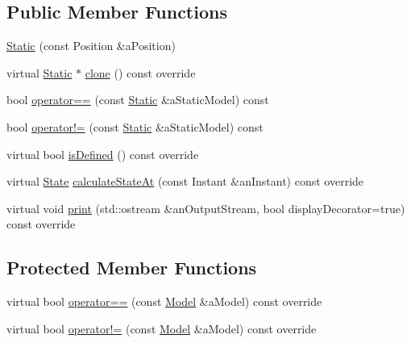 \subsection*{Public Member Functions}
\begin{DoxyCompactItemize}
\item 
\hyperlink{classostk_1_1astro_1_1trajectory_1_1models_1_1_static_a8d7240ef6b3ae12d6bdb4320b225a146}{Static} (const Position \&a\+Position)
\item 
virtual \hyperlink{classostk_1_1astro_1_1trajectory_1_1models_1_1_static}{Static} $\ast$ \hyperlink{classostk_1_1astro_1_1trajectory_1_1models_1_1_static_abe3edbc72ae2f4fbd6c2593e2aa08755}{clone} () const override
\item 
bool \hyperlink{classostk_1_1astro_1_1trajectory_1_1models_1_1_static_af74de1e58f8fc4373706264062a42faa}{operator==} (const \hyperlink{classostk_1_1astro_1_1trajectory_1_1models_1_1_static}{Static} \&a\+Static\+Model) const
\item 
bool \hyperlink{classostk_1_1astro_1_1trajectory_1_1models_1_1_static_af1f7415dfe8c549156734749ef4caaf4}{operator!=} (const \hyperlink{classostk_1_1astro_1_1trajectory_1_1models_1_1_static}{Static} \&a\+Static\+Model) const
\item 
virtual bool \hyperlink{classostk_1_1astro_1_1trajectory_1_1models_1_1_static_a5a80d75c9215af9b198c9f8653c5bc17}{is\+Defined} () const override
\item 
virtual \hyperlink{classostk_1_1astro_1_1trajectory_1_1_state}{State} \hyperlink{classostk_1_1astro_1_1trajectory_1_1models_1_1_static_a4297a74c953a105dc887a31227fbe1ff}{calculate\+State\+At} (const Instant \&an\+Instant) const override
\item 
virtual void \hyperlink{classostk_1_1astro_1_1trajectory_1_1models_1_1_static_aae663f763324f081911ea47070c9f79f}{print} (std\+::ostream \&an\+Output\+Stream, bool display\+Decorator=true) const override
\end{DoxyCompactItemize}
\subsection*{Protected Member Functions}
\begin{DoxyCompactItemize}
\item 
virtual bool \hyperlink{classostk_1_1astro_1_1trajectory_1_1models_1_1_static_a0ef36b672baa80f522135d86f3b6bb9c}{operator==} (const \hyperlink{classostk_1_1astro_1_1trajectory_1_1_model}{Model} \&a\+Model) const override
\item 
virtual bool \hyperlink{classostk_1_1astro_1_1trajectory_1_1models_1_1_static_af85efc113db69c75c1afc7db0e81297b}{operator!=} (const \hyperlink{classostk_1_1astro_1_1trajectory_1_1_model}{Model} \&a\+Model) const override
\end{DoxyCompactItemize}
